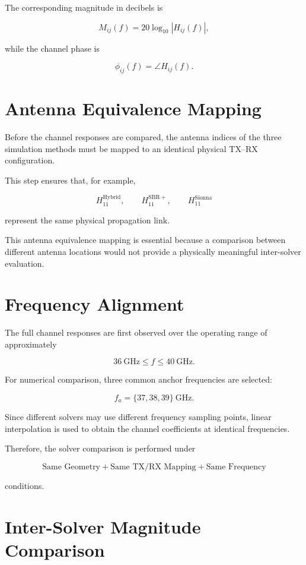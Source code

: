 \documentclass[11pt,a4paper]{article}
\begin{document}
The corresponding magnitude in decibels is

\[
M_{ij}(f)
=
20\log_{10}|H_{ij}(f)|,
\]

while the channel phase is

\[
\phi_{ij}(f)
=
\angle H_{ij}(f).
\]

\section{Antenna Equivalence Mapping}

Before the channel responses are compared, the antenna indices of the three simulation methods must be mapped to an identical physical TX--RX configuration.

This step ensures that, for example,

\[
H_{11}^{\mathrm{Hybrid}},
\qquad
H_{11}^{\mathrm{SBR+}},
\qquad
H_{11}^{\mathrm{Sionna}}
\]

represent the same physical propagation link.

This antenna equivalence mapping is essential because a comparison between different antenna locations would not provide a physically meaningful inter-solver evaluation.

\section{Frequency Alignment}

The full channel responses are first observed over the operating range of approximately

\[
36~\mathrm{GHz}
\leq f
\leq
40~\mathrm{GHz}.
\]

For numerical comparison, three common anchor frequencies are selected:

\[
f_a
=
\{37,38,39\}~\mathrm{GHz}.
\]

Since different solvers may use different frequency sampling points, linear interpolation is used to obtain the channel coefficients at identical frequencies.

Therefore, the solver comparison is performed under

\[
\boxed{
\text{Same Geometry}
+
\text{Same TX/RX Mapping}
+
\text{Same Frequency}
}
\]

conditions.

\section{Inter-Solver Magnitude Comparison}
\end{document}
